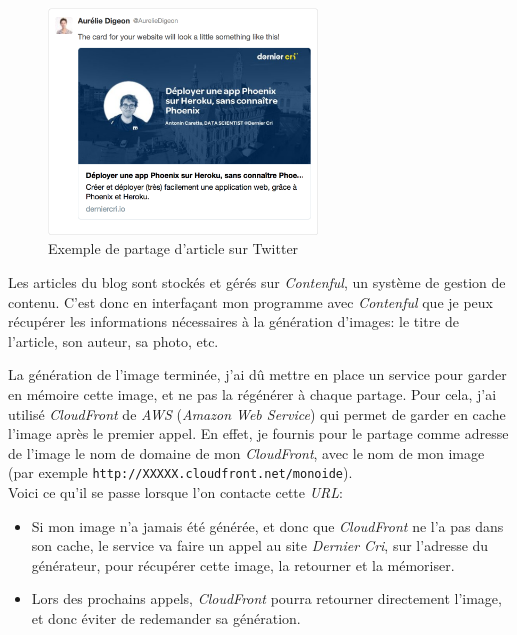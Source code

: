 \documentclass[12pt,a4paper]{article}
\begin{document}
  \begin{figure}[h]
    \centering
    \includegraphics[height=6cm]{figures/partage-blog.png}
    \caption{Exemple de partage d'article sur Twitter}
  \end{figure}

  \bigskip

  Les articles du blog sont stockés et gérés sur \emph{Contenful}, un
  système de gestion de contenu. C'est donc en interfaçant mon programme
  avec \emph{Contenful} que je peux récupérer les informations nécessaires
  à la génération d'images: le titre de l'article, son auteur, sa photo,
  etc.

  \bigskip

  La génération de l'image terminée, j'ai dû mettre en place un service
  pour garder en mémoire cette image, et ne pas la régénérer à chaque
  partage. Pour cela, j'ai utilisé \emph{CloudFront} de \emph{AWS}
  (\emph{Amazon Web Service}) qui permet de garder en cache l'image après
  le premier appel. En effet, je fournis pour le partage comme adresse de
  l'image le nom de domaine de mon \emph{CloudFront}, avec le nom de mon
  image (par exemple \texttt{http://XXXXX.cloudfront.net/monoide}).\\
  Voici ce qu'il se passe lorsque l'on contacte cette \emph{URL}:

  \begin{itemize}
  \item
    Si mon image n'a jamais été générée, et donc que \emph{CloudFront} ne
    l'a pas dans son cache, le service va faire un appel au site
    \emph{Dernier Cri}, sur l'adresse du générateur, pour récupérer cette
    image, la retourner et la mémoriser.
  \item
    Lors des prochains appels, \emph{CloudFront} pourra retourner
    directement l'image, et donc éviter de redemander sa génération.
  \end{itemize}
\end{document}
